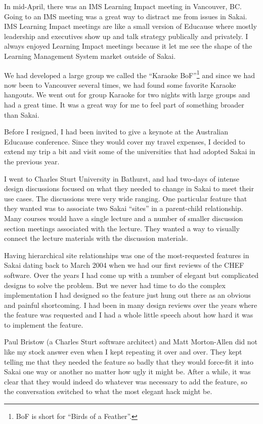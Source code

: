 \documentclass[12pt]{book}
\begin{document}

In mid-April, there was an IMS Learning Impact meeting in Vancouver, BC.
Going to an IMS meeting was a great way to distract me from issues in Sakai.
IMS Learning Impact meetings are like a small version of Educause where
mostly leadership and executives show up and talk strategy publically 
and privately.   I always enjoyed Learning Impact meetings because it
let me see the shape of the Learning Management System market outside of
Sakai.   

We had developed a large group we called the 
``Karaoke BoF''\footnote{BoF is short for ``Birds of a Feather''.}
and since we had now been to Vancouver several times, we had found some favorite 
Karaoke hangouts.   We went out for group Karaoke for two nights with 
large groups and had a great time.   It was a great way for me to feel
part of something broader than Sakai.


Before I resigned, I had been invited to give a keynote at the Australian
Educause conference.  Since they would cover my travel expenses, I decided
to extend my trip a bit and visit some of the universities that had adopted
Sakai in the previous year.

I went to Charles Sturt University in Bathurst, and had two-days of
intense design discussions focused on what they needed to change in Sakai to
meet their use cases.   The discussions were very wide ranging.  One particular
feature that they wanted was to associate two Sakai ``sites'' in a parent-child
relationship.  Many courses would have a single lecture and a number of
smaller discussion section meetings associated with the lecture.  They wanted
a way to visually connect the lecture materials with the discussion materials.

Having hierarchical site relationships was one of the most-requested features in
Sakai dating back to March 2004 when we had our first reviews of the CHEF software.
Over the years I had come up with a number of elegant but complicated
designs to solve the problem.
But we never had time to do the complex implementation I had designed so the feature
just hung out there as an obvious and painful shortcoming.   I had been in
many design reviews over the years where the feature was requested and
I had a whole little speech
about how hard it was to implement the feature.

Paul Bristow (a Charles Sturt software architect) and
Matt Morton-Allen did not like my stock answer even when I kept repeating it over and over.
They kept telling me that they needed the feature so badly that they would force-fit it
into Sakai one way or another no matter how ugly it might be.  After a while, it was
clear that they would indeed do whatever was necessary to add the feature, so the conversation
switched to what the most elegant hack might be.
\end{document}
